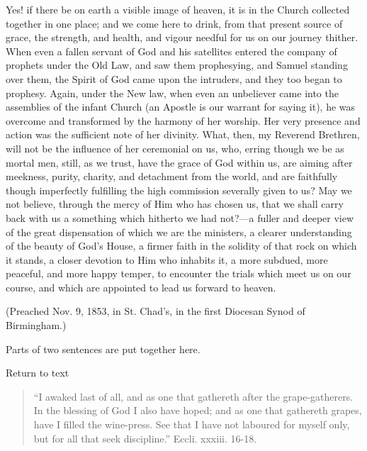 Yes! if there be on earth a visible image of heaven,
it is in the Church collected together in one place; and
we come here to drink, from that present source of grace,
the strength, and health, and vigour needful for us on
our journey thither. When even a fallen servant of God
and his satellites entered the company of prophets under
the Old Law, and saw them prophesying, and Samuel
standing over them, the Spirit of God came upon the
intruders, and they too began to prophesy. Again, under
the New law, when even an unbeliever came into the
assemblies of the infant Church (an Apostle is our
warrant for saying it), he was overcome and transformed
by the harmony of her worship. Her very presence and
action was the sufficient note of her divinity. What,
then, my Reverend Brethren, will not be the influence of
her ceremonial on us, who, erring though we be as mortal
men, still, as we trust, have the grace of God within us,
are aiming after meekness, purity, charity, and
detachment from the world, and are faithfully though
imperfectly fulfilling the high commission severally
given to us? May we not believe, through the mercy of Him
who has chosen us, that we shall carry back with us a
something which hitherto we had not?—a fuller and
deeper view of the great dispensation of which we are the
ministers, a clearer understanding of the beauty of God's
House, a firmer faith in the solidity of that rock on
which it stands, a closer devotion to Him who inhabits
it, a more subdued, more peaceful, and more happy temper,
to encounter the trials which meet us on our course, and
which are appointed to lead us forward to heaven.

(Preached Nov. 9, 1853, in St. Chad's, in the first
Diocesan Synod of Birmingham.)


Parts of two sentences are put together here.

Return to text


\begin{quote}

``I awaked last of all, and as one that
gathereth after the grape-gatherers. In the blessing
of God I also have hoped; and as one that gathereth
grapes, have I filled the wine-press. See that I have
not laboured for myself only, but for all that seek
discipline.'' Eccli. xxxiii. 16-18.

\end{quote}

